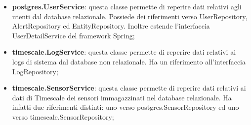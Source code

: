 \begin{landscape}
\begin{itemize}
			\item \textbf{postgres.UserService}: questa classe permette di reperire dati relativi agli utenti dal database relazionale. Possiede dei riferimenti verso UserRepository, AlertRepository ed EntityRepository. Inoltre estende l'interfaccia UserDetailService del framework Spring;
			\item \textbf{timescale.LogService}: questa classe permette di reperire dati relativi ai logs di sistema dal database non relazionale. Ha un riferimento all'interfaccia LogRepository;
			\item \textbf{timescale.SensorService}: questa classe permette di reperire dati relativi ai dati di Timescale dei sensori immagazzinati nel database relazionale. Ha infatti due riferimenti distinti: uno verso postgres.SensorRepository ed uno verso timescale.SensorRepository;
		\end{itemize}
	

\end{landscape}
